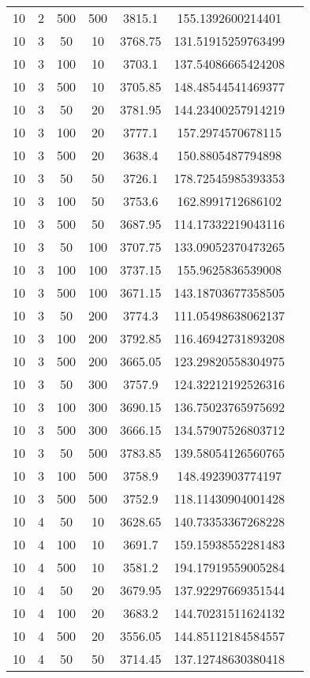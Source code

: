 {\begin{longtabu}{S
S
S
S
S
S[round-mode=places,round-precision=0]
S[round-mode=places,round-precision=0]}
10 & 2 & 500 & 500 & 3815.1 & 155.1392600214401 \\
10 & 3 & 50 & 10 & 3768.75 & 131.51915259763499 \\
10 & 3 & 100 & 10 & 3703.1 & 137.54086665424208 \\
10 & 3 & 500 & 10 & 3705.85 & 148.48544541469377 \\
10 & 3 & 50 & 20 & 3781.95 & 144.23400257914219 \\
10 & 3 & 100 & 20 & 3777.1 & 157.2974570678115 \\
10 & 3 & 500 & 20 & 3638.4 & 150.8805487794898 \\
10 & 3 & 50 & 50 & 3726.1 & 178.72545985393353 \\
10 & 3 & 100 & 50 & 3753.6 & 162.8991712686102 \\
10 & 3 & 500 & 50 & 3687.95 & 114.17332219043116 \\
10 & 3 & 50 & 100 & 3707.75 & 133.09052370473265 \\
10 & 3 & 100 & 100 & 3737.15 & 155.9625836539008 \\
10 & 3 & 500 & 100 & 3671.15 & 143.18703677358505 \\
10 & 3 & 50 & 200 & 3774.3 & 111.05498638062137 \\
10 & 3 & 100 & 200 & 3792.85 & 116.46942731893208 \\
10 & 3 & 500 & 200 & 3665.05 & 123.29820558304975 \\
10 & 3 & 50 & 300 & 3757.9 & 124.32212192526316 \\
10 & 3 & 100 & 300 & 3690.15 & 136.75023765975692 \\
10 & 3 & 500 & 300 & 3666.15 & 134.57907526803712 \\
10 & 3 & 50 & 500 & 3783.85 & 139.58054126560765 \\
10 & 3 & 100 & 500 & 3758.9 & 148.4923903774197 \\
10 & 3 & 500 & 500 & 3752.9 & 118.11430904001428 \\
10 & 4 & 50 & 10 & 3628.65 & 140.73353367268228 \\
10 & 4 & 100 & 10 & 3691.7 & 159.15938552281483 \\
10 & 4 & 500 & 10 & 3581.2 & 194.17919559005284 \\
10 & 4 & 50 & 20 & 3679.95 & 137.92297669351544 \\
10 & 4 & 100 & 20 & 3683.2 & 144.70231511624132 \\
10 & 4 & 500 & 20 & 3556.05 & 144.85112184584557 \\
10 & 4 & 50 & 50 & 3714.45 & 137.12748630380418 \\

\end{longtabu}}
